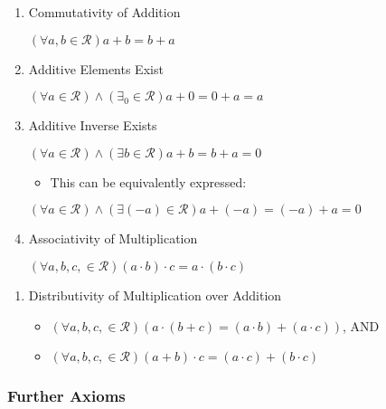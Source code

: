 \documentclass[a4paper,11pt,twoside]{article}
\begin{document}
\begin{enumerate}
\item Commutativity of Addition

\(\left( \forall a,b \in \mathcal{R}  \right) a +  b = b +  a\)

\item Additive Elements Exist

\(\left( \forall a \in \mathcal{R} \right) \wedge \left( \exists_0 \in \mathcal{R} \right) a +  0= 0 +  a =  a\)

\item Additive Inverse Exists

\(\left( \forall a \in \mathcal{R} \right)\wedge \left( \exists b \in \mathcal{R} \right) a +  b =  b +  a = 0\)

\begin{itemize}
\item This can be equivalently expressed:
\end{itemize}

\(\left( \forall a \in \mathcal{R} \right)\wedge \left( \exists \left( - a\right)\in \mathcal{R} \right) a +  \left( - a \right) = \left( - a \right) +  a = 0\)

\item Associativity of Multiplication

\(\left( \forall a,b,c, \in \mathcal{R} \right)\left( a \cdot  b \right)\cdot c = a \cdot  \left( b \cdot  c \right)\)
\end{enumerate}


\begin{enumerate}
\item Distributivity of Multiplication over Addition

\begin{itemize}
\item \(\left( \forall a,b,c, \in \mathcal{R} \right) \left( a\cdot  \left( b+ c \right)=  \left( a \cdot   b  \right) +  \left( a \cdot   c  \right) \right)\), AND
\item \(\left( \forall a,b,c, \in \mathcal{R} \right)\left( a +  b \right)\cdot   c = \left( a \cdot   c  \right)+  \left( b \cdot   c \right)\)
\end{itemize}
\end{enumerate}








\subsubsection{Further Axioms}
\label{sec:org6f11198}
\end{document}
